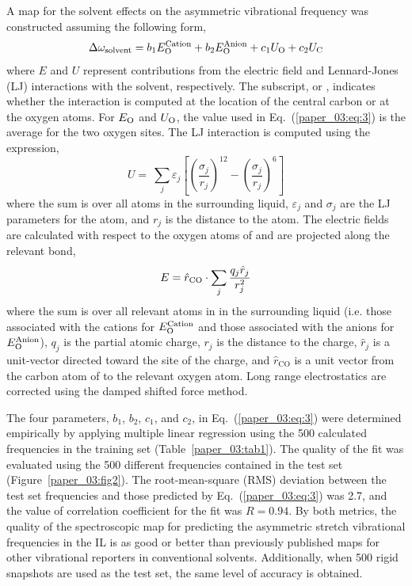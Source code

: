\documentclass[%
  class = book,%
  crop = false,%
  float = true,%
  multi = true,%
  preview = false,%
]{standalone}
\let\cite\autocite
\begin{document}
A map for the solvent effects on the asymmetric  vibrational frequency was constructed assuming the following form,
\begin{equation}
  \label{paper_03:eq:3}
  \Delta\omega_{\text{solvent}} = b_{1}E_{\ce{O}}^{\text{Cation}} + b_{2}E_{\ce{O}}^{\text{Anion}} + c_{1}U_{\ce{O}} + c_{2}U_{\ce{C}}
\end{equation}
where \(E\) and \(U\) represent contributions from the electric field and Lennard-Jones (LJ) interactions with the solvent, respectively. The subscript,  or , indicates whether the interaction is computed at the location of the  central carbon or at the oxygen atoms. For \(E_{\ce{O}}\) and \(U_{\ce{O}}\), the value used in Eq.~(\ref{paper_03:eq:3}) is the average for the two  oxygen sites. The LJ interaction is computed using the expression,
\begin{equation}
  \label{paper_03:eq:4}
  U = \ \sum_{j}^{}\varepsilon_{j}\left\lbrack \left( \frac{\sigma_{j}}{r_{j}} \right)^{12} - \left( \frac{\sigma_{j}}{r_{j}} \right)^{6} \right\rbrack
\end{equation}
where the sum is over all atoms in the surrounding liquid, \(\varepsilon_{j}\) and \(\sigma_{j}\) are the LJ parameters for the atom, and \(r_{j}\) is the distance to the atom. The electric fields are calculated with respect to the oxygen atoms of  and are projected along the relevant  bond,
\begin{equation}
  \label{paper_03:eq:5}
  E = {\hat{r}}_{\ce{CO}} \cdot \sum_{j}^{}\frac{q_{j}{\hat{r}}_{j}}{r_{j}^{2}}
\end{equation}
where the sum is over all relevant atoms in in the surrounding liquid (i.e. those associated with the cations for \(E_{\ce{O}}^{\text{Cation}}\) and those associated with the anions for \(E_{\ce{O}}^{\text{Anion}}\)), \(q_{j}\) is the partial atomic charge, \(r_{j}\) is the distance to the charge, \({\hat{r}}_{j}\) is a unit-vector directed toward the site of the charge, and \({\hat{r}}_{\mathrm{\text{CO}}}\) is a unit vector from the carbon atom of  to the relevant oxygen atom. Long range electrostatics are corrected using the damped shifted force method.\cite{fennell_is_2006}

The four parameters, \(b_{1}\), \(b_{2}\), \(c_{1}\), and \(c_{2}\), in Eq.~(\ref{paper_03:eq:3}) were determined empirically by applying multiple linear regression using the \num{500} calculated frequencies in the training set (Table~\ref{paper_03:tab1}). The quality of the fit was evaluated using the \num{500} different frequencies contained in the test set (Figure~\ref{paper_03:fig2}). The root-mean-square (RMS) deviation between the test set frequencies and those predicted by Eq.~(\ref{paper_03:eq:3}) was \SI{2.7}{\wavenumber}, and the value of correlation coefficient for the fit was \(R = 0.94\). By both metrics, the quality of the spectroscopic map for predicting the  asymmetric stretch vibrational frequencies in the \ce{[C4C1im][PF6]} IL is as good or better than previously published maps for other vibrational reporters in conventional solvents. Additionally, when \num{500} rigid  snapshots are used as the test set, the same level of accuracy is obtained.
\end{document}
